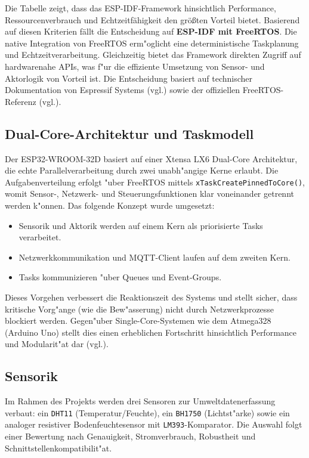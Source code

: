 \noindent Die Tabelle zeigt, dass das ESP-IDF-Framework hinsichtlich Performance, Ressourcenverbrauch und Echtzeitfähigkeit den größten Vorteil bietet. Basierend auf diesen Kriterien fällt die Entscheidung auf \textbf{ESP-IDF mit FreeRTOS}. Die native Integration von FreeRTOS erm"oglicht eine deterministische Taskplanung und Echtzeitverarbeitung. Gleichzeitig bietet das Framework direkten Zugriff auf hardwarenahe APIs, was f"ur die effiziente Umsetzung von Sensor- und Aktorlogik von Vorteil ist. Die Entscheidung basiert auf technischer Dokumentation von Espressif Systems (vgl.\autocite{espressif_idf}) sowie der offiziellen FreeRTOS-Referenz (vgl.\autocite{freertos_doc}).

\subsection{Dual-Core-Architektur und Taskmodell}

Der ESP32-WROOM-32D basiert auf einer Xtensa LX6 Dual-Core Architektur, die echte Parallelverarbeitung durch zwei unabh"angige Kerne erlaubt. Die Aufgabenverteilung erfolgt "uber FreeRTOS mittels \texttt{xTaskCreatePinnedToCore()}, womit Sensor-, Netzwerk- und Steuerungsfunktionen klar voneinander getrennt werden k"onnen. Das folgende Konzept wurde umgesetzt:
\\
\begin{itemize}
	\item Sensorik und Aktorik werden auf einem Kern als priorisierte Tasks verarbeitet.
	\item Netzwerkkommunikation und MQTT-Client laufen auf dem zweiten Kern.
	\item Tasks kommunizieren "uber Queues und Event-Groups.
\end{itemize}
\vspace{1em}
\noindent Dieses Vorgehen verbessert die Reaktionszeit des Systems und stellt sicher, dass kritische Vorg"ange (wie die Bew"asserung) nicht durch Netzwerkprozesse blockiert werden. Gegen"uber Single-Core-Systemen wie dem Atmega328 (Arduino Uno) stellt dies einen erheblichen Fortschritt hinsichtlich Performance und Modularit"at dar (vgl.\autocite{espressif_trm}).


\subsection{Sensorik}

Im Rahmen des Projekts werden drei Sensoren zur Umweltdatenerfassung verbaut: ein \texttt{DHT11} (Temperatur/Feuchte), ein \texttt{BH1750} (Lichtst"arke) sowie ein analoger resistiver Bodenfeuchtesensor mit \texttt{LM393}-Komparator. Die Auswahl folgt einer Bewertung nach Genauigkeit, Stromverbrauch, Robustheit und Schnittstellenkompatibilit"at.

